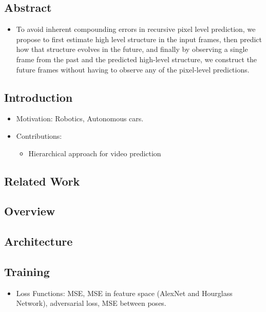 \documentclass{article}
\begin{document}
    \subsection*{Abstract}
    \begin{itemize}
        \item To avoid inherent compounding errors in recursive pixel level prediction, we propose to first estimate high level structure in the input frames, then predict how that structure evolves in the future, and finally by observing a single frame from the past and the predicted high-level structure, we construct the future frames without having to observe any of the pixel-level predictions.
    \end{itemize}

    \subsection{Introduction}\label{subsec:Learning_to_Generate_Long_term_Future_via_Hierarchical_Prediction:introduction}
    \begin{itemize}
        \item Motivation: Robotics, Autonomous cars.
        \item Contributions:
        \begin{itemize}
            \item Hierarchical approach for video prediction
        \end{itemize}
    \end{itemize}

    \subsection{Related Work}\label{subsec:Learning_to_Generate_Long_term_Future_via_Hierarchical_Prediction:related-work}

    \subsection{Overview}\label{subsec:Learning_to_Generate_Long_term_Future_via_Hierarchical_Prediction:overview}

    \subsection{Architecture}\label{subsec:Learning_to_Generate_Long_term_Future_via_Hierarchical_Prediction:architecture}

    \subsection{Training}\label{subsec:Learning_to_Generate_Long_term_Future_via_Hierarchical_Prediction:training}
    \begin{itemize}
        \item Loss Functions: MSE, MSE in feature space (AlexNet and Hourglass Network), adversarial loss, MSE between poses.
    \end{itemize}
\end{document}
